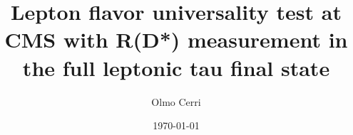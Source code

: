 \documentclass[11pt,twoside,a4paper,cmspaper]{cms-tdr}
\begin{document}
%
%
%


%
%
%



\title{Lepton flavor universality test at CMS with R(D*) measurement in the full leptonic tau final state}

\address[inst1]{California Institute of Technology (US)}
\author*[inst1]{Olmo Cerri}

\date{\today}
\end{document}
